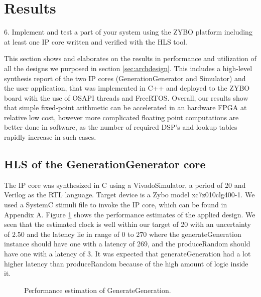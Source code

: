 \section{Results}\label{sec:results}
\begin{framed}
6. Implement and test a part of your system using the ZYBO platform including at least one IP core written and verified with the HLS tool.
\end{framed}

This section shows and elaborates on the results in performance and utilization of all the designs we purposed in section \ref{sec:archdesign}. This includes a high-level synthesis report of the two IP cores (GenerationGenerator and Simulator) and the user application, that was implemented in C++ and deployed to the ZYBO board with the use of OSAPI threads and FreeRTOS. Overall, our results show that simple fixed-point arithmetic can be accelerated in an hardware FPGA at relative low cost, however more complicated floating point computations are better done in software, as the number of required DSP's and lookup tables rapidly increase in such cases.

\subsection{HLS of the GenerationGenerator core}

The IP core was synthesized in C using a VivadoSimulator, a period of 20 and Verilog as the RTL language. Target device is a Zybo model xc7z010clg400-1. We used a SystemC stimuli file to invoke the IP core, which can be found in Appendix A. Figure \ref{fig:ggperformanceestimates} shows the performance estimates of the applied design. We seen that the estimated clock is well within our target of 20 with an uncertainty of 2.50 and the latency lie in range of 0 to 270 where the generateGeneration instance should have one with a latency of 269, and the produceRandom should have one with a latency of 3. It was expected that generateGeneration had a lot higher latency than produceRandom because of the high amount of logic inside it.

\begin{figure}[h!]
	\centering
	\caption{Performance estimation of GenerateGeneration.}
	\label{fig:ggperformanceestimates}
\end{figure}


